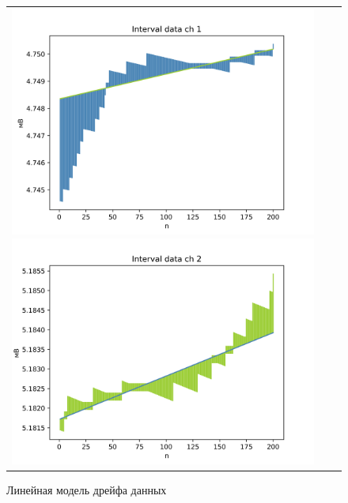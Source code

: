 \begin{figure}[H]
	\begin{tabular}{ccc}
		\includegraphics[scale=0.5]{resources/lr_PR1.png}
		\includegraphics[scale=0.5]{resources/lr_PR2.png}
	\end{tabular}
	\caption{Линейная модель дрейфа данных} 
\end{figure}

